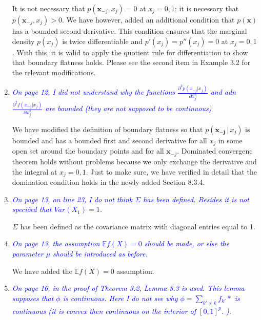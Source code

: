 \documentclass[pdftex,12pt]{article}
\def\E{{\mathbb E}}
\def\rc#1{{\it\textcolor{blue}{#1}}\smallskip}
\begin{document}
\begin{enumerate}
It is not necessary that $p(\mathbf{x}_{-j}, x_j) = 0$ at $x_j = 0,1$; it is necessary that $p(\mathbf{x}_{-j}, x_j) > 0$. We have however, added an additional condition that $p(\mathbf{x})$ has a bounded second derivative. This condition ensures that the marginal density $p(x_j)$ is twice differentiable and $p'(x_j) = p''(x_j) = 0$ at $x_j = 0,1$. With this, it is valid to apply the quotient rule for differentiation to show that boundary flatness holds. Please see the second item in Example 3.2 for the relevant modifications. 


\item \rc{On page 12, I did not understand why the functions 
$\frac{\partial^2 p(x_{-j} |  x_j)}{\partial x_j^2}$
and adn 
$\frac{\partial^2 f(x_{-j} |  x_j)}{\partial x_j^2}$
are bounded (they are not supposed to be continuous)}


We have modified the definition of boundary flatness so that $p(\mathbf{x_{-j}} \,|\, x_j)$ is bounded and has a bounded first and second derivative for all $x_j$ in some open set around the boundary points and for all $\mathbf{x}_{-j}$. Dominated convergenc theorem holds without problems because we only exchange the derivative and the integral at $x_j = 0,1$. Just to make sure, we have verified in detail that the domination condition holds in the newly added Section 8.3.4.


\item \rc{On page 13, on line 23, I do not think $\Sigma$ has been defined. Besides it
is not speciôed that $Var(X_1) = 1$.}

$\Sigma$ has been defined as the covariance matrix with diagonal entries equal to 1.


\item \rc{On page 13, the assumption $\E f(X) = 0$ should be made, or else the
parameter $\mu$ should be introduced as before.}

We have added the $\E f(X) = 0$ assumption.


\item \rc{On page 16, in the proof of Theorem 3.2, Lemma 8.3 is used. This
lemma supposes that $\phi$ is continuous. Here I do not see why $\phi =
\sum_{k'\neq k} f_{k'}*$ is continuous (it is convex then continuous on the interior of
$[0,1]^p$. ).}


\end{enumerate}
\end{document}

